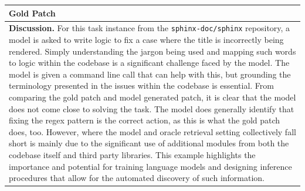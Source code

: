 \begin{table}
\begin{tabular}{p{\linewidth}}
\toprule
\textbf{Gold Patch}
 \\
\midrule
\textbf{Discussion.}
For this task instance from the \texttt{sphinx-doc/sphinx} repository, a model is asked to write logic to fix a case where the title is incorrectly being rendered.
Simply understanding the jargon being used and mapping such words to logic within the codebase is a significant challenge faced by the model.
The model is given a command line call that can help with this, but grounding the terminology presented in the issues within the codebase is essential.
From comparing the gold patch and model generated patch, it is clear that the model does not come close to solving the task.
The model does generally identify that fixing the regex pattern is the correct action, as this is what the gold patch does, too.
However, where the model and oracle retrieval setting collectively fall short is mainly due to the significant use of additional modules from both the codebase itself and third party libraries.
This example highlights the importance and potential for training language models and designing inference procedures that allow for the automated discovery of such information.\\
\bottomrule
\end{tabular}
\end{table}
\newpage